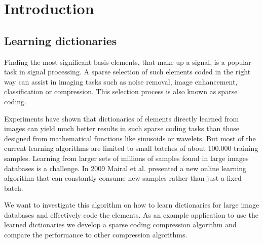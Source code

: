 \chapter{Introduction}
\label{sec:introduction}
\section{Learning dictionaries}

Finding the most significant basis elements, that make up a
signal, is a popular task in signal processing. A sparse selection of such
elements coded in the right way can assist in imaging tasks such as noise
removal, image enhancement, classification or compression. This selection
process is also known as sparse coding.

Experiments \cite{Chen1998,Elad2006} have shown that dictionaries of 
elements directly learned from images can yield much better results in
such sparse coding tasks than those designed from mathematical functions like
sinusoids or wavelets. But most of the current learning algorithms are limited
to small batches of about 100.000 training samples. Learning from
larger sets of millions of samples found in large images databases is a
challenge. In 2009 Mairal et al.\cite{Mairal2009} presented a new online
learning algorithm that can constantly consume new samples rather than just a
fixed batch. 

We want to investigate this algorithm on how to learn dictionaries
for large image databases and effectively code the elements. As an example
application to use the learned dictionaries we develop a sparse coding
compression algorithm and compare the performance to other compression
algorithms.


